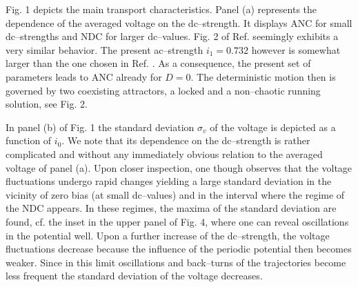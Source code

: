 \documentclass[a4,twocolumn,showpacs,showkeys]{revtex4}
\begin{document}
Fig. 1 depicts the main transport characteristics. Panel (a) represents
the dependence of the averaged voltage on the dc--strength.
It displays ANC for small dc--strengths and NDC for larger
dc--values. Fig. 2  of Ref. \cite{kosturPRB} seemingly exhibits a very
similar behavior. The present ac--strength $i_1=0.732$ however is
somewhat larger than 
the one chosen in  Ref. \cite{kosturPRB}. As a consequence, the present set of
parameters 
leads to ANC already for $D=0$.  
The deterministic motion then is governed by two coexisting
attractors, a locked and a non--chaotic running solution, see
Fig. 2.  

In panel (b) of Fig. 1 the standard deviation $\sigma_v$ of the voltage 
is depicted as a function of $i_{0}$. We note
that its dependence on the dc--strength is rather complicated and
without any immediately obvious relation to the averaged voltage of panel (a).  
Upon closer
inspection, one though observes that the voltage fluctuations 
undergo rapid changes yielding a large standard deviation
in the vicinity of zero bias (at small dc--values) and in
the interval where the regime of the NDC appears. In these
regimes, the maxima of the standard deviation are found, cf. the inset in the
upper panel of Fig. 4, where one can reveal oscillations in the
potential well.  Upon a further increase of the dc--strength, the
voltage
fluctuations decrease because the influence of the
periodic potential then becomes weaker.  Since in this limit
oscillations and back--turns of the trajectories become less frequent  the
standard deviation of the voltage decreases. 
\end{document}
